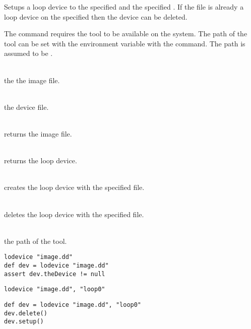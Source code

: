 %


Setups a loop device to the specified  and the specified . 
If the file is already a loop device on the specified  then 
the device can be deleted.

The command requires the tool \cite{losetup13} to be 
available on the system. The path of the tool can be set with the
environment variable  with the 
command. The path is assumed to be .

\begin{asparadesc}
%
\item[\code{file}] \hfill \\
the the image file.
%
\item[\code{device}] \hfill \\
the device file.
%
\item[\code{theFile}] \hfill \\
returns the image file.
%
\item[\code{theDevice}] \hfill \\
returns the loop device.
%
\item[\code{setup()}] \hfill \\
creates the loop device with the specified file.
%
\item[\code{delete()}] \hfill \\
deletes the loop device with the specified file.
%
\item[\code{LOSETUP\_COMMAND}] \hfill \\
the path of the  tool.
%
\end{asparadesc}

\begin{lstlisting}[style=Groovybash, label={lst:example_lodevice1}, title={
Setups the image file on the next available loop device.}]
lodevice "image.dd"
def dev = lodevice "image.dd"
assert dev.theDevice != null
\end{lstlisting}

\begin{lstlisting}[style=Groovybash, label={lst:example_lodevice2}, title={
Setups the image file on the specified loop device.}]
lodevice "image.dd", "loop0"
\end{lstlisting}

\begin{lstlisting}[style=Groovybash, label={lst:example_lodevice3}, title={
Deletes the loop device.}]
def dev = lodevice "image.dd", "loop0"
dev.delete()
dev.setup()
\end{lstlisting}

